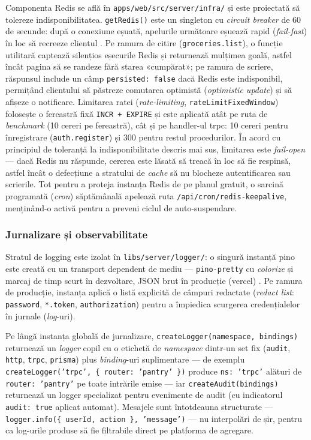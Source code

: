 Componenta Redis se află în \texttt{apps/web/src/server/infra/} și este proiectată să tolereze indisponibilitatea. \texttt{getRedis()} este un singleton cu \textit{circuit breaker} de 60 de secunde: după o conexiune eșuată, apelurile următoare eșuează rapid (\textit{fail-fast}) în loc să recreeze clientul \cite{redis}. Pe ramura de citire (\texttt{groceries.list}), o funcție utilitară captează silențios eșecurile Redis și returnează mulțimea goală, astfel încât pagina să se randeze fără starea «cumpărat»; pe ramura de scriere, răspunsul include un câmp \texttt{persisted: false} dacă Redis este indisponibil, permițând clientului să păstreze comutarea optimistă (\textit{optimistic update}) și să afișeze o notificare. Limitarea ratei (\textit{rate-limiting}, \texttt{rateLimitFixedWindow}) folosește o fereastră fixă \texttt{INCR + EXPIRE} și este aplicată atât pe ruta de \textit{benchmark} (10 cereri pe fereastră), cât și pe handler-ul \gls{trpc}: 10 cereri pentru înregistrare (\texttt{auth.register}) și 300 pentru restul procedurilor. În acord cu principiul de toleranță la indisponibilitate descris mai sus, limitarea este \textit{fail-open} --- dacă Redis nu răspunde, cererea este lăsată să treacă în loc să fie respinsă, astfel încât o defecțiune a stratului de \textit{cache} să nu blocheze autentificarea sau scrierile. Tot pentru a proteja instanța Redis de pe planul gratuit, o sarcină programată (\textit{cron}) săptămânală apelează ruta \texttt{/api/cron/\allowbreak redis-keepalive}, menținând-o activă pentru a preveni ciclul de auto-suspendare.

\subsubsection{Jurnalizare și observabilitate}\label{subsec:jurnalizare}

Stratul de \gls{logging} este izolat în \texttt{libs/server/logger/}: o singură instanță \gls{pino} este creată cu un transport dependent de mediu --- \texttt{pino-pretty} cu \textit{colorize} și marcaj de timp scurt în dezvoltare, JSON brut în producție (\gls{vercel}) \cite{pino}. Pe ramura de producție, instanța aplică o listă explicită de câmpuri redactate (\textit{redact list}: \texttt{password}, \texttt{*.token}, \texttt{authorization}) pentru a împiedica scurgerea credențialelor în jurnale (\textit{log}-uri).

Pe lângă instanța globală de jurnalizare, \texttt{createLogger(namespace, bindings)} returnează un \textit{logger} copil cu o etichetă de \textit{namespace} dintr-un set fix (\texttt{audit}, \texttt{http}, \texttt{trpc}, \texttt{prisma}) plus \textit{binding}-uri suplimentare --- de exemplu \texttt{createLogger('trpc', \{ router: 'pantry' \})} produce \texttt{ns: 'trpc'} alături de \texttt{router: 'pantry'} pe toate intrările emise --- iar \texttt{createAudit(bindings)} returnează un logger specializat pentru evenimente de audit (cu indicatorul \texttt{audit: true} aplicat automat). Mesajele sunt întotdeauna structurate --- \texttt{logger.info(\{ userId, action \}, 'message')} --- nu interpolări de șir, pentru ca log-urile produse să fie filtrabile direct pe platforma de agregare.

